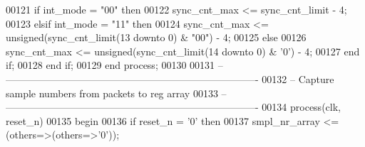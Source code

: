\begin{DoxyCode}
00121       \textcolor{keywordflow}{if} \textcolor{vhdlchar}{int_mode} \textcolor{vhdlchar}{=} \textcolor{vhdllogic}{"00"} \textcolor{keywordflow}{then} 
00122          \textcolor{vhdlchar}{sync_cnt_max} \textcolor{vhdlchar}{<=} \textcolor{vhdlchar}{sync_cnt_limit} \textcolor{vhdlchar}{-} \textcolor{vhdllogic}{}\textcolor{vhdllogic}{4};
00123       \textcolor{keywordflow}{elsif} \textcolor{vhdlchar}{int_mode} \textcolor{vhdlchar}{=} \textcolor{vhdllogic}{"11"} \textcolor{keywordflow}{then} 
00124          \textcolor{vhdlchar}{sync_cnt_max} \textcolor{vhdlchar}{<=} \textcolor{comment}{unsigned}\textcolor{vhdlchar}{(}\textcolor{vhdlchar}{sync_cnt_limit}\textcolor{vhdlchar}{(}\textcolor{vhdllogic}{}\textcolor{vhdllogic}{13} \textcolor{keywordflow}{downto} \textcolor{vhdllogic}{}\textcolor{vhdllogic}{0}\textcolor{vhdlchar}{)} \textcolor{vhdlchar}{&} \textcolor{vhdllogic}{"00"}\textcolor{vhdlchar}{)} \textcolor{vhdlchar}{-} \textcolor{vhdllogic}{}\textcolor{vhdllogic}{4};
00125       \textcolor{keywordflow}{else}
00126          \textcolor{vhdlchar}{sync_cnt_max} \textcolor{vhdlchar}{<=} \textcolor{comment}{unsigned}\textcolor{vhdlchar}{(}\textcolor{vhdlchar}{sync_cnt_limit}\textcolor{vhdlchar}{(}\textcolor{vhdllogic}{}\textcolor{vhdllogic}{14} \textcolor{keywordflow}{downto} \textcolor{vhdllogic}{}\textcolor{vhdllogic}{0}\textcolor{vhdlchar}{)} \textcolor{vhdlchar}{&} \textcolor{vhdlchar}{'}\textcolor{vhdllogic}{}\textcolor{vhdllogic}{0}\textcolor{vhdlchar}{'}\textcolor{vhdlchar}{)} \textcolor{vhdlchar}{-} \textcolor{vhdllogic}{}\textcolor{vhdllogic}{4};
00127       \textcolor{keywordflow}{end} \textcolor{keywordflow}{if};
00128    \textcolor{keywordflow}{end} \textcolor{keywordflow}{if};
00129 \textcolor{keywordflow}{end} \textcolor{keywordflow}{process};
00130 
00131 \textcolor{keyword}{-- ----------------------------------------------------------------------------}
00132 \textcolor{keyword}{-- Capture sample numbers from packets to reg array}
00133 \textcolor{keyword}{-- ----------------------------------------------------------------------------}
00134 \textcolor{keywordflow}{process}(clk, reset_n)
00135 \textcolor{vhdlkeyword}{begin}
00136    \textcolor{keywordflow}{if} \textcolor{vhdlchar}{reset_n} \textcolor{vhdlchar}{=} \textcolor{vhdlchar}{'}\textcolor{vhdllogic}{}\textcolor{vhdllogic}{0}\textcolor{vhdlchar}{'} \textcolor{keywordflow}{then} 
00137       \textcolor{vhdlchar}{smpl_nr_array} \textcolor{vhdlchar}{<=} \textcolor{vhdlchar}{(}\textcolor{keywordflow}{others}\textcolor{vhdlchar}{=}\textcolor{vhdlchar}{>}\textcolor{vhdlchar}{(}\textcolor{keywordflow}{others}\textcolor{vhdlchar}{=}\textcolor{vhdlchar}{>}\textcolor{vhdlchar}{'}\textcolor{vhdllogic}{}\textcolor{vhdllogic}{0}\textcolor{vhdlchar}{'}\textcolor{vhdlchar}{)}\textcolor{vhdlchar}{)};

\end{DoxyCode}
